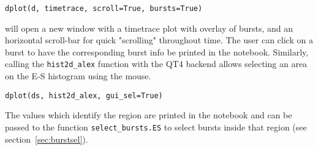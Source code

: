 \begin{lstlisting}
dplot(d, timetrace, scroll=True, bursts=True)
\end{lstlisting}

\noindent
will open a new window with a timetrace plot with overlay of bursts, and an horizontal scroll-bar for quick
"scrolling" throughout time. The user can click on a burst to have the corresponding burst info
be printed in the notebook.
Similarly, calling the \verb|hist2d_alex| function with the QT4 backend allows
selecting an area on the E-S histogram using the mouse.

\begin{lstlisting}
dplot(ds, hist2d_alex, gui_sel=True)
\end{lstlisting}

The values which identify the region are printed in the notebook and can be passed
to the function \verb|select_bursts.ES| to select bursts inside that region
(see section~\ref{sec:burstsel}).
